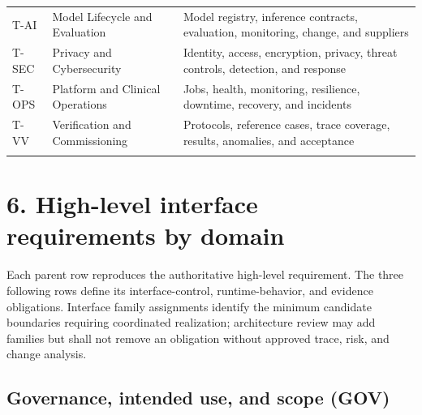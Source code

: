 \documentclass[11pt,letterpaper]{article}
\begin{document}
\begin{small}
\begin{longtable}{@{}L{0.12\textwidth}L{0.26\textwidth}L{0.54\textwidth}@{}}
\addlinespace[2pt]
T-AI & Model Lifecycle and Evaluation & Model registry, inference contracts, evaluation, monitoring, change, and suppliers \\
\addlinespace[2pt]
T-SEC & Privacy and Cybersecurity & Identity, access, encryption, privacy, threat controls, detection, and response \\
\addlinespace[2pt]
T-OPS & Platform and Clinical Operations & Jobs, health, monitoring, resilience, downtime, recovery, and incidents \\
\addlinespace[2pt]
T-VV & Verification and Commissioning & Protocols, reference cases, trace coverage, results, anomalies, and acceptance \\
\addlinespace[2pt]
\end{longtable}
\end{small}

\section{6. High-level interface requirements by domain}
Each parent row reproduces the authoritative high-level requirement. The three following rows define its interface-control, runtime-behavior, and evidence obligations. Interface family assignments identify the minimum candidate boundaries requiring coordinated realization; architecture review may add families but shall not remove an obligation without approved trace, risk, and change analysis.

\subsection{Governance, intended use, and scope (GOV)}
\end{document}
